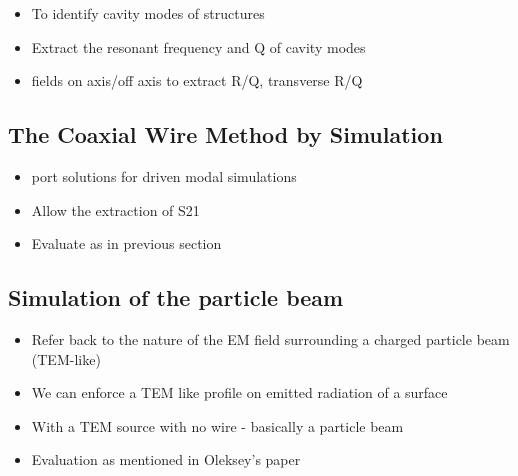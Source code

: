 \begin{itemize}
\item{To identify cavity modes of structures}
\item{Extract the resonant frequency and Q of cavity modes}
\item{fields on axis/off axis to extract R/Q, transverse R/Q}
\end{itemize}

\subsection{The Coaxial Wire Method by Simulation}
\begin{itemize}
\item{port solutions for driven modal simulations}
\item{Allow the extraction of S21}
\item{Evaluate as in previous section}
\end{itemize}

\subsection{Simulation of the particle beam}

\begin{itemize}
\item{Refer back to the nature of the EM field surrounding a charged particle beam (TEM-like)}
\item{We can enforce a TEM like profile on emitted radiation of a surface}
\item{With a TEM source with no wire - basically a particle beam}
\item{Evaluation as mentioned in Oleksey's paper}
\end{itemize}